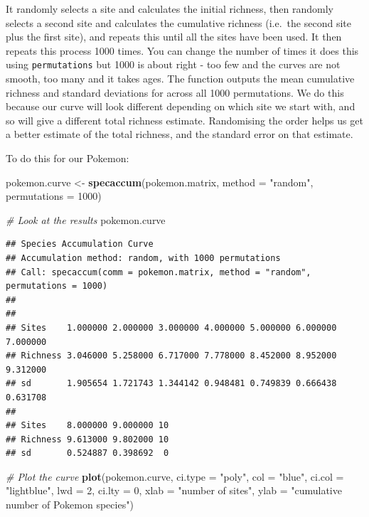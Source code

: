 \documentclass[]{book}
\newenvironment{Shaded}{\begin{snugshade}}{\end{snugshade}}
\newcommand{\KeywordTok}[1]{\textcolor[rgb]{0.13,0.29,0.53}{\textbf{{#1}}}}
\newcommand{\DataTypeTok}[1]{\textcolor[rgb]{0.13,0.29,0.53}{{#1}}}
\newcommand{\DecValTok}[1]{\textcolor[rgb]{0.00,0.00,0.81}{{#1}}}
\newcommand{\StringTok}[1]{\textcolor[rgb]{0.31,0.60,0.02}{{#1}}}
\newcommand{\CommentTok}[1]{\textcolor[rgb]{0.56,0.35,0.01}{\textit{{#1}}}}
\newcommand{\NormalTok}[1]{{#1}}
\theoremstyle{definition}
\theoremstyle{definition}
\theoremstyle{definition}
\theoremstyle{remark}
\begin{document}
It randomly selects a site and calculates the initial richness, then
randomly selects a second site and calculates the cumulative richness
(i.e.~the second site plus the first site), and repeats this until all
the sites have been used. It then repeats this process 1000 times. You
can change the number of times it does this using \texttt{permutations}
but 1000 is about right - too few and the curves are not smooth, too
many and it takes ages. The function outputs the mean cumulative
richness and standard deviations for across all 1000 permutations. We do
this because our curve will look different depending on which site we
start with, and so will give a different total richness estimate.
Randomising the order helps us get a better estimate of the total
richness, and the standard error on that estimate.

To do this for our Pokemon:

\begin{Shaded}
\begin{Highlighting}[]
\NormalTok{pokemon.curve <-}\StringTok{ }\KeywordTok{specaccum}\NormalTok{(pokemon.matrix, }\DataTypeTok{method =} \StringTok{"random"}\NormalTok{, }\DataTypeTok{permutations =} \DecValTok{1000}\NormalTok{)}

\CommentTok{# Look at the results}
\NormalTok{pokemon.curve}
\end{Highlighting}
\end{Shaded}

\begin{verbatim}
## Species Accumulation Curve
## Accumulation method: random, with 1000 permutations
## Call: specaccum(comm = pokemon.matrix, method = "random", permutations = 1000) 
## 
##                                                                        
## Sites    1.000000 2.000000 3.000000 4.000000 5.000000 6.000000 7.000000
## Richness 3.046000 5.258000 6.717000 7.778000 8.452000 8.952000 9.312000
## sd       1.905654 1.721743 1.344142 0.948481 0.749839 0.666438 0.631708
##                              
## Sites    8.000000 9.000000 10
## Richness 9.613000 9.802000 10
## sd       0.524887 0.398692  0
\end{verbatim}

\begin{Shaded}
\begin{Highlighting}[]
\CommentTok{# Plot the curve}
\KeywordTok{plot}\NormalTok{(pokemon.curve, }\DataTypeTok{ci.type =} \StringTok{"poly"}\NormalTok{, }\DataTypeTok{col =} \StringTok{"blue"}\NormalTok{, }\DataTypeTok{ci.col =} \StringTok{"lightblue"}\NormalTok{, }
     \DataTypeTok{lwd =} \DecValTok{2}\NormalTok{, }\DataTypeTok{ci.lty =} \DecValTok{0}\NormalTok{, }\DataTypeTok{xlab =} \StringTok{"number of sites"}\NormalTok{, }
     \DataTypeTok{ylab =} \StringTok{"cumulative number of Pokemon species"}\NormalTok{)}
\end{Highlighting}
\end{Shaded}
\end{document}
